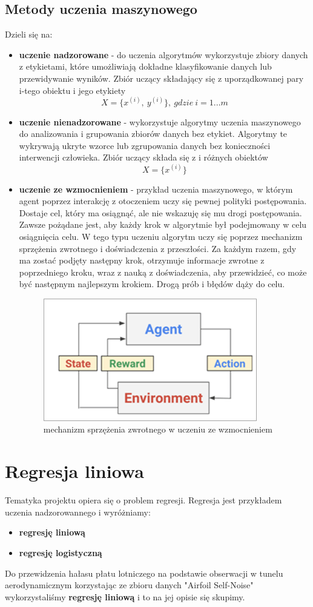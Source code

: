 \documentclass{article}
\begin{document}
\subsection{Metody uczenia maszynowego}
Dzieli się na:
\begin{itemize}
  \item \textbf{uczenie nadzorowane} - do uczenia algorytmów wykorzystuje zbiory danych z etykietami, które umożliwiają dokładne klasyfikowanie danych lub przewidywanie wyników. Zbiór uczący składający się z uporządkowanej pary i-tego obiektu i jego etykiety \[ X = \{x^{(i)},\ y^{(i)}\},\ gdzie\ i = 1...m\]
  \item \textbf{uczenie nienadzorowane} - wykorzystuje algorytmy uczenia maszynowego do analizowania i grupowania zbiorów danych bez etykiet. Algorytmy te wykrywają ukryte wzorce lub zgrupowania danych bez konieczności interwencji człowieka. Zbiór uczący składa się z i różnych obiektów \[X = \{ x^{(i)} \}\]
  \item \textbf{uczenie ze wzmocnieniem} - przykład uczenia maszynowego, w którym agent poprzez interakcję z otoczeniem uczy się pewnej polityki postępowania. Dostaje cel, który ma osiągnąć, ale nie wskazuję się mu drogi postępowania. Zawsze pożądane jest, aby każdy krok w algorytmie był podejmowany w celu osiągnięcia celu. W tego typu uczeniu algorytm uczy się poprzez mechanizm sprzężenia zwrotnego i doświadczenia z przeszłości. Za każdym razem, gdy ma zostać podjęty następny krok, otrzymuje informacje zwrotne z poprzedniego kroku, wraz z nauką z doświadczenia, aby przewidzieć, co może być następnym najlepszym krokiem. Drogą prób i błędów dąży do celu.
\begin{figure}[h]
\caption{mechanizm sprzężenia zwrotnego w uczeniu ze wzmocnieniem}
\includegraphics[scale=0.7]{uczenie_ze_wzmocnieniem}
\end{figure}
  
\end{itemize}
\section{Regresja liniowa}
Tematyka projektu opiera się o problem regresji. Regresja jest przykładem uczenia nadzorowannego i wyróżniamy:
\begin{itemize}
\item \textbf{regresję liniową}
\item \textbf{regresję logistyczną}
\end{itemize}
Do przewidzenia hałasu płatu lotniczego na podstawie obserwacji w tunelu aerodynamicznym korzystając ze zbioru danych "Airfoil Self-Noise" wykorzystaliśmy \textbf{regresję liniową} i to na jej opisie się skupimy.
\end{document}
